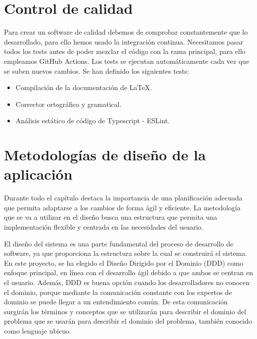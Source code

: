 \section{Control de calidad}
\label{sc:control-calidad}
Para crear un software de calidad debemos de comprobar constantemente que lo desarrollado, para ello hemos usado la integración continua.
Necesitamos pasar todos los tests antes de poder mezclar el código con la rama principal, para ello empleamos GitHub Actions.
Los tests se ejecutan automáticamente cada vez que se suben nuevos cambios. Se han definido los siguientes tests:

\begin{itemize}
    \item{Compilación de la documentación de LaTeX.}
    \item{Corrector ortográfico y gramatical.}
    \item{Análisis estático de código de Typescript - ESLint.}
\end{itemize}

\section{Metodologías de diseño de la aplicación}
Durante todo el capítulo destaca la importancia de una planificación adecuada que permita adaptarse a los cambios de forma ágil y eficiente.
La metodología que se va a utilizar en el diseño busca una estructura que permita una implementación flexible y centrada en las necesidades del usuario.

El diseño del sistema es una parte fundamental del proceso de desarrollo de software, ya que proporciona la estructura sobre la cual se construirá el sistema.
En este proyecto, se ha elegido el Diseño Dirigido por el Dominio (DDD) \cite{domain-drive-design} como enfoque principal, en línea con el desarrollo ágil debido a que ambos se centran en el usuario.
Además, DDD es buena opción cuando los desarrolladores no conocen el dominio, porque mediante la comunicación constante con los expertos de dominio se puede llegar a un entendimiento común.
De esta comunicación surgirán los términos y conceptos que se utilizarán para describir el dominio del problema que se usarán para describir el dominio del problema, también conocido como lenguaje ubicuo.

